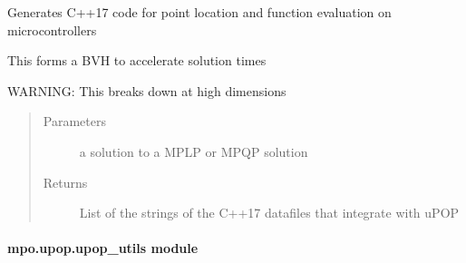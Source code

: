 \documentclass[letterpaper,10pt,english]{sphinxmanual}
\begin{document}
\begin{fulllineitems}
\label{\detokenize{mpo.upop:mpo.upop.ucontroller.generate_code}}
\sphinxAtStartPar
Generates C++17 code for point location and function evaluation on microcontrollers

\sphinxAtStartPar
This forms a BVH to accelerate solution times

\sphinxAtStartPar
WARNING: This breaks down at high dimensions
\begin{quote}\begin{description}
\item[{Parameters}] \leavevmode
\sphinxAtStartPar
{} \textendash{} a solution to a MPLP or MPQP solution

\item[{Returns}] \leavevmode
\sphinxAtStartPar
List of the strings of the C++17 datafiles that integrate with uPOP

\end{description}\end{quote}

\end{fulllineitems}



\paragraph{mpo.upop.upop\_utils module}
\label{\detokenize{mpo.upop:module-mpo.upop.upop_utils}}\label{\detokenize{mpo.upop:mpo-upop-upop-utils-module}}
\end{document}
